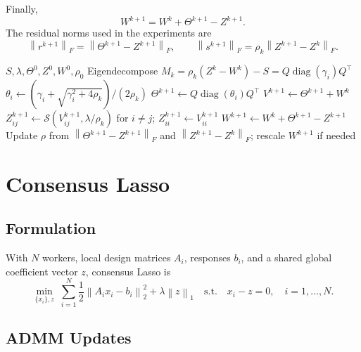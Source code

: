 \documentclass[11pt]{article}
\newcommand{\diag}{\operatorname{diag}}
\newcommand{\shrink}{\mathcal{S}}
\newcommand{\norm}[1]{\left\lVert #1 \right\rVert}
\begin{document}
Finally,
\begin{equation}
    W^{k+1}=W^k+\Theta^{k+1}-Z^{k+1}.
\end{equation}
The residual norms used in the experiments are
\begin{equation}
    \norm{r^{k+1}}_F=\norm{\Theta^{k+1}-Z^{k+1}}_F,
    \qquad
    \norm{s^{k+1}}_F
    =
    \rho_k\norm{Z^{k+1}-Z^k}_F.
\end{equation}

\begin{algorithm}[t]
\caption{Graphical lasso ADMM with online $\rho$}
\label{alg:glasso}
\begin{algorithmic}[1]
\Require $S,\lambda,\Theta^0,Z^0,W^0,\rho_0$
    \State Eigendecompose $M_k=\rho_k(Z^k-W^k)-S=Q\diag(\gamma_i)Q^\top$
    \State $\theta_i\gets(\gamma_i+\sqrt{\gamma_i^2+4\rho_k})/(2\rho_k)$
    \State $\Theta^{k+1}\gets Q\diag(\theta_i)Q^\top$
    \State $V^{k+1}\gets \Theta^{k+1}+W^k$
    \State $Z^{k+1}_{ij}\gets\shrink(V^{k+1}_{ij},\lambda/\rho_k)$ for $i\neq j$;
           $Z^{k+1}_{ii}\gets V^{k+1}_{ii}$
    \State $W^{k+1}\gets W^k+\Theta^{k+1}-Z^{k+1}$
    \State Update $\rho$ from $\norm{\Theta^{k+1}-Z^{k+1}}_F$ and
           $\norm{Z^{k+1}-Z^k}_F$; rescale $W^{k+1}$ if needed
\EndFor
\end{algorithmic}
\end{algorithm}

\section{Consensus Lasso}

\subsection{Formulation}

With $N$ workers, local design matrices $A_i$, responses $b_i$, and a shared
global coefficient vector $z$, consensus Lasso is
\begin{equation}
    \min_{\{x_i\},z}\;
    \sum_{i=1}^N \frac{1}{2}\norm{A_i x_i-b_i}_2^2
    +\lambda\norm{z}_1
    \quad \text{s.t.}\quad
    x_i-z=0,\quad i=1,\ldots,N .
    \label{eq:consensus-lasso}
\end{equation}

\subsection{ADMM Updates}
\end{document}

